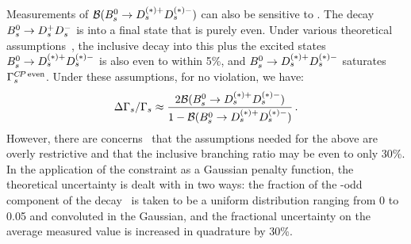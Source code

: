 {Measurements of ${\cal B}(B^0_s \to D_s^{(*)+} D_s^{(*)-})$ can 
also be sensitive to \DGs.
The decay $B^0_s \to D_s^{+} D_s^{-}$ is into
a final state that is purely \CP even. 
Under various theoretical assumptions~\cite{Aleksan:1993qp,Dunietz:2000cr}, the
inclusive decay into this plus the excited states
$B^0_s \to D_s^{(*)+} D_s^{(*)-}$ is also \CP even
to within 5\%, and 
$B^0_s \to D_s^{(*)+} D_s^{(*)-}$ saturates
$\Gamma_{s}^{C\!P \thinspace {\rm even}}$.
Under these assumptions, for no \CP violation, we have: 
\begin{equation}
\DGGs \approx
\frac{2 \BR{\Bs \to D_s^{(*)+} D_s^{(*)-}}}
{1 - \BR{\Bs \to D_s^{(*)+} D_s^{(*)-}}} \,.
\labe{dGsBr}
\end{equation}
However, there are concerns~\cite{Nierste_private:2006} 
that the assumptions needed
for the above are overly restrictive and that the inclusive branching
ratio may be \CP even to only 30\%.
In the application of the constraint as a Gaussian penalty
function, the theoretical uncertainty is dealt with in two ways:
the fraction of the \CP-odd component of the decay~\cite{Dunietz:2000cr} 
is taken
to be a uniform distribution ranging from 0 to 0.05 and
convoluted in the Gaussian, and the fractional uncertainty on the
average measured value is increased in quadrature by 
30\%.

}

